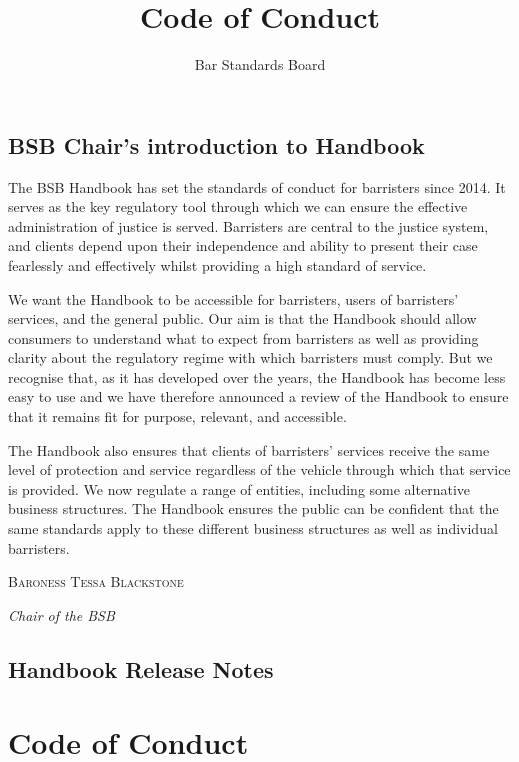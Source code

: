 \documentclass[a4paper,twoside]{memoir}
\title{Code of Conduct}
\author{Bar Standards Board}
\begin{document}

\cleartoverso
\frontmatter
\begin{KeepFromToc}
  \tableofcontents
\end{KeepFromToc}
\chapter{BSB Chair’s introduction to Handbook}

The BSB Handbook has set the standards of conduct for barristers since 2014. It serves as the key regulatory tool through which we can ensure the effective administration of justice is served. Barristers are central to the justice system, and clients depend upon their independence and ability to present their case fearlessly and effectively whilst providing a high standard of service.

We want the Handbook to be accessible for barristers, users of barristers’ services, and the general public. Our aim is that the Handbook should allow consumers to understand what to expect from barristers as well as providing clarity about the regulatory regime with which barristers must comply. But we recognise that, as it has developed over the years, the Handbook has become less easy to use and we have therefore announced a review of the Handbook to ensure that it remains fit for purpose, relevant, and accessible.

The Handbook also ensures that clients of barristers’ services receive the same level of protection and service regardless of the vehicle through which that service is provided. We now regulate a range of entities, including some alternative business structures. The Handbook ensures the public can be confident that the same standards apply to these different business structures as well as individual barristers.

\medskip
\hfill\scshape Baroness Tessa Blackstone

\normalfont\hfill\itshape Chair of the BSB
\normalfont
\chapter{Handbook Release Notes}

\mainmatter

\part{Code of Conduct}	





\end{document}
